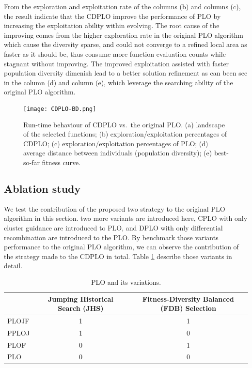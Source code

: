 \documentclass[3p]{elsarticle}
\begin{document}
From the exploration and exploitation rate of the columns (b) and columns (c), the result indicate that the CDPLO improve the performance of PLO by increasing the exploitation ability within evolving. The root cause of the improving comes from the higher exploration rate in the original PLO algorithm which cause the diversity sparse, and could not converge to a refined local area as faster as it should be, thus consume more function evaluation counts while stagnant without improving. The improved exploitation assisted with faster population diversity dimenish lead to a better solution refinement as can been see in the column (d) and column (e), which leverage the searching ability of the original PLO algorithm.

\begin{figure}[htbp]
  \centering
  \texttt{[image: CDPLO-BD.png]}
  \caption{Run-time behaviour of CDPLO
           vs.\ the original PLO.
           (a) landscape of the selected functions;
           (b) exploration/exploitation percentages of CDPLO;
           (c) exploration/exploitation percentages of PLO;
           (d) average distance between individuals (population diversity);
           (e) best-so-far fitness curve.}
  \label{fig: CDPLO-BD}
\end{figure}

\subsection{Ablation study}
We test the contribution of the proposed two strategy to the original PLO algorithm in this section. two more variants are introduced here, CPLO with only cluster guidance are introduced to PLO, and DPLO with only differential recombination are introduced to the PLO. By benchmark those variants performance to the original PLO algorithm, we can observe the contribution of the strategy made to the CDPLO in total. Table \ref{table: PLO variants} describe those variants in detail.

\begin{table}[h!]
\centering
\caption{PLO and its variations.}
\label{table: PLO variants}
\begin{tabular}{lcc}
\toprule
 & Jumping Historical Search (JHS) & Fitness-Diversity Balanced (FDB) Selection \\
\midrule
PLOJF & 1 & 1 \\ 
PPLOJ & 1 & 0 \\ 
PLOF  & 0 & 1 \\ 
PLO   & 0 & 0 \\ 
\bottomrule
\end{tabular}
\end{table}
\end{document}
